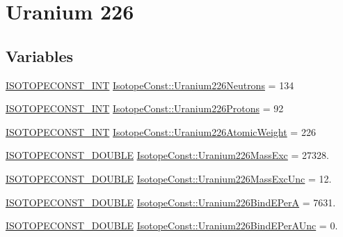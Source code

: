 \hypertarget{group___isotope_const-_uranium-_u226}{}\section{Uranium 226}
\label{group___isotope_const-_uranium-_u226}
\subsection*{Variables}
\begin{DoxyCompactItemize}
\item 
\mbox{\hyperlink{group___isotope_const-_macros_ga5f18360b3e99483a35c32d789e62621c}{I\+S\+O\+T\+O\+P\+E\+C\+O\+N\+S\+T\+\_\+\+I\+NT}} \mbox{\hyperlink{group___isotope_const-_uranium-_u226_ga69d99d8d434d798c1f8f8cae0f4f33a1}{Isotope\+Const\+::\+Uranium226\+Neutrons}} = 134
\item 
\mbox{\hyperlink{group___isotope_const-_macros_ga5f18360b3e99483a35c32d789e62621c}{I\+S\+O\+T\+O\+P\+E\+C\+O\+N\+S\+T\+\_\+\+I\+NT}} \mbox{\hyperlink{group___isotope_const-_uranium-_u226_ga41645f58808881c921c5502d6a88c326}{Isotope\+Const\+::\+Uranium226\+Protons}} = 92
\item 
\mbox{\hyperlink{group___isotope_const-_macros_ga5f18360b3e99483a35c32d789e62621c}{I\+S\+O\+T\+O\+P\+E\+C\+O\+N\+S\+T\+\_\+\+I\+NT}} \mbox{\hyperlink{group___isotope_const-_uranium-_u226_gaffe22bf2c47f1ff420883953139e4fbe}{Isotope\+Const\+::\+Uranium226\+Atomic\+Weight}} = 226
\item 
\mbox{\hyperlink{group___isotope_const-_macros_ga8f45a7272ce02c0b4c65c44636ed719a}{I\+S\+O\+T\+O\+P\+E\+C\+O\+N\+S\+T\+\_\+\+D\+O\+U\+B\+LE}} \mbox{\hyperlink{group___isotope_const-_uranium-_u226_ga8801c14e9cc1ef77d31f0da3c036e26b}{Isotope\+Const\+::\+Uranium226\+Mass\+Exc}} = 27328.
\item 
\mbox{\hyperlink{group___isotope_const-_macros_ga8f45a7272ce02c0b4c65c44636ed719a}{I\+S\+O\+T\+O\+P\+E\+C\+O\+N\+S\+T\+\_\+\+D\+O\+U\+B\+LE}} \mbox{\hyperlink{group___isotope_const-_uranium-_u226_ga6e36f745307885a515f194cb118c86d3}{Isotope\+Const\+::\+Uranium226\+Mass\+Exc\+Unc}} = 12.
\item 
\mbox{\hyperlink{group___isotope_const-_macros_ga8f45a7272ce02c0b4c65c44636ed719a}{I\+S\+O\+T\+O\+P\+E\+C\+O\+N\+S\+T\+\_\+\+D\+O\+U\+B\+LE}} \mbox{\hyperlink{group___isotope_const-_uranium-_u226_gabd54a9760eb67199bc07a77e93a3fb16}{Isotope\+Const\+::\+Uranium226\+Bind\+E\+PerA}} = 7631.
\item 
\mbox{\hyperlink{group___isotope_const-_macros_ga8f45a7272ce02c0b4c65c44636ed719a}{I\+S\+O\+T\+O\+P\+E\+C\+O\+N\+S\+T\+\_\+\+D\+O\+U\+B\+LE}} \mbox{\hyperlink{group___isotope_const-_uranium-_u226_ga1c6e57af3fa639e704d9f4f8c906950c}{Isotope\+Const\+::\+Uranium226\+Bind\+E\+Per\+A\+Unc}} = 0.

\end{DoxyCompactItemize}
